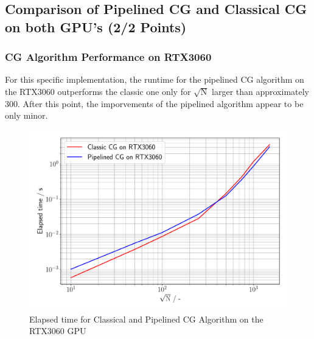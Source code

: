 \subsection{Comparison of Pipelined CG and Classical CG on both GPU's (2/2 Points)}


\subsubsection{CG Algorithm Performance on RTX3060}
For this specific implementation, the runtime for the pipelined CG algorithm on the RTX3060 outperforms the classic one only for $\sqrt{\mathrm{N}}$ larger than approximately 300.
After this point, the imporvements of the pipelined algorithm appear to be only minor. 
\begin{figure}[h]
    \begin{center}
    \includegraphics[width=\linewidth]{figures/task_7_rtx_plot.pdf}
    \caption{Elapsed time for Classical and Pipelined CG Algorithm on the RTX3060 GPU}
    \end{center}
\end{figure}

\pagebreak

